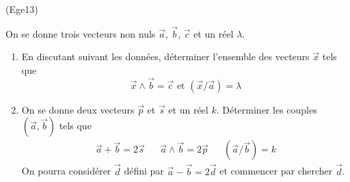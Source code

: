 \begin{tiny}(Ege13)\end{tiny} On se donne trois vecteurs non nuls $\overrightarrow a$, $\overrightarrow b$, $\overrightarrow c$ et un réel $\lambda$.
\begin{enumerate}
 \item En discutant suivant les données, déterminer l'ensemble des vecteurs $\overrightarrow x$ tels que
\begin{displaymath}
 \overrightarrow x \wedge \overrightarrow b = \overrightarrow c \text{ et }(\overrightarrow x /\overrightarrow a)=\lambda
\end{displaymath}
 \item On se donne deux vecteurs $\overrightarrow p$ et $\overrightarrow s$ et un réel $k$. Déterminer les couples $(\overrightarrow a, \overrightarrow b)$ tels que
\begin{align*}
 \overrightarrow a + \overrightarrow b =2 \overrightarrow s & &
 \overrightarrow a \wedge \overrightarrow b =2 \overrightarrow p & &
 (\overrightarrow a / \overrightarrow b ) = k
\end{align*}
On pourra considérer $\overrightarrow d$ défini par $\overrightarrow a - \overrightarrow b =2 \overrightarrow d $ et commencer par chercher $\overrightarrow d$.
\end{enumerate}
